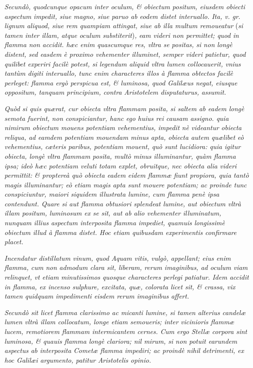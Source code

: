 \documentclass[11pt,twoside,openany]{book}
\begin{document}
\textit{Secundò, quodcunque opacum inter oculum, \& obiectum positum, eiusdem obiecti aspectum impedit, siue magno, siue paruo ab eodem distet interuallo. }\textit{Ita, v. gr. lignum aliquod, siue rem quampiam attingat, siue ab illa multum remoueatur }(\textit{si tamen inter illam, atque oculum substiterit})\textit{, }\textit{eam videri non permittet; quod in flamma non accidit. hæc enim quascumque res, vltra se positas, si non longè distent, sed easdem è proximo vehementer illuminet, semper videri patietur, quod quilibet experiri facilè potest, si legendum aliquid vltra lumen collocauerit, vnius tantùm digiti interuallo, tunc enim characteres illos à flamma obtectos facilè perleget: flamma ergò perspicua est, \& luminosa, quod Galilæus negat, eiusque oppositum, tanquam principium, contra Aristotelem disputaturus, assumit.}


\textit{Quòd si quis quærat, cur obiecta vltra flammam posita, si saltem ab eadem longè semota fuerint, non conspiciantur, hanc ego huius rei causam assigno. quia nimirum obiectum mouens potentiam vehementius, impedit nè videantur obiecta reliqua, ad eamdem potentiam mouendam minus apta, obiecta autem quælibet eò vehementius, cæteris paribus, potentiam mouent, quò sunt lucidiora: quia igitur obiecta, longè vltra flammam posita, multò minus illuminantur, quàm flamma ipsa; ideò hæc potentiam veluti totam explet, obruitque, nec obiecta alia videri permittit: \& proptereà quò obiecta eadem eidem flammæ fiunt propiora, quia tantò magis illuminantur; eò etiam magis apta sunt mouere potentiam; ac proinde tunc conspiciuntur, maiori siquidem illustrata lumine, cum flamma penè ipsa contendunt. Quare si aut flamma obtusiori splendeat lumine, aut obiectum vltrà illam positum, luminosum ex se sit, aut ab alio vehementer illuminatum, nunquam illius aspectum interposita flamma impediet, quamuis longissimè obiectum illud à flamma distet. Hoc etiam quibusdam experimentis confirmare placet.}


\textit{Incendatur distillatum vinum, quod Aquam vitis, vulgò, appellant; eius enim flamma, cum non admodum clara sit, liberam, rerum imaginibus, ad oculum viam relinquet, vt etiam minutissimos quosque characteres perlegi patiatur. Idem accidit in flamma, ex incenso sulphure, excitata, quæ, colorata licet sit, \& crassa, vix tamen quidquam impedimenti eisdem rerum imaginibus affert.}


\textit{Secundò sit licet flamma clarissimo ac micanti lumine, si tamen alterius candelæ lumen vltrà illam collocatum, longe etiam semoueris; inter vicinioris flammæ lucem, remotiorem flammam intermicantem cernes. Cum ergo Stellæ corpora sint luminosa, \& quauis flamma longè clariora; nil mirum, si non potuit earundem aspectus ab interposita Cometæ flamma impediri; ac proindè nihil detrimenti, ex hoc Galilæi argumento, patitur Aristotelis opinio.}
\end{document}
